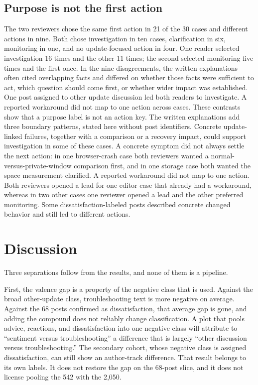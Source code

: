 \documentclass[conference,letterpaper]{IEEEtran}
\begin{document}
\subsection{Purpose is not the first action}
The two reviewers chose the same first action in 21 of the 30 cases and different actions in nine. Both chose investigation in ten cases, clarification in six, monitoring in one, and no update-focused action in four. One reader selected investigation 16 times and the other 11 times; the second selected monitoring five times and the first once. In the nine disagreements, the written explanations often cited overlapping facts and differed on whether those facts were sufficient to act, which question should come first, or whether wider impact was established. One post assigned to other update discussion led both readers to investigate. A reported workaround did not map to one action across cases. These contrasts show that a purpose label is not an action key. The written explanations add three boundary patterns, stated here without post identifiers. Concrete update-linked failures, together with a comparison or a recovery impact, could support investigation in some of these cases. A concrete symptom did not always settle the next action: in one browser-crash case both reviewers wanted a normal-versus-private-window comparison first, and in one storage case both wanted the space measurement clarified. A reported workaround did not map to one action. Both reviewers opened a lead for one editor case that already had a workaround, whereas in two other cases one reviewer opened a lead and the other preferred monitoring. Some dissatisfaction-labeled posts described concrete changed behavior and still led to different actions.

\section{Discussion}
Three separations follow from the results, and none of them is a pipeline.

First, the valence gap is a property of the negative class that is used. Against the broad other-update class, troubleshooting text is more negative on average. Against the 68 posts confirmed as dissatisfaction, that average gap is gone, and adding the compound does not reliably change classification. A plot that pools advice, reactions, and dissatisfaction into one negative class will attribute to ``sentiment versus troubleshooting'' a difference that is largely ``other discussion versus troubleshooting.'' The secondary cohort, whose negative class is assigned dissatisfaction, can still show an author-track difference. That result belongs to its own labels. It does not restore the gap on the 68-post slice, and it does not license pooling the 542 with the 2,050.
\end{document}
